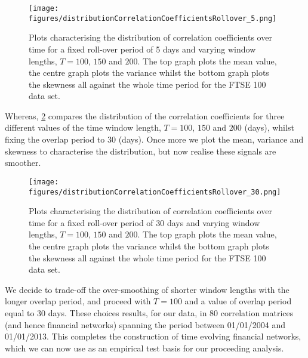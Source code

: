 \begin{figure}
	\centering
	\texttt{[image: figures/distributionCorrelationCoefficientsRollover\_5.png]}
	\caption[Plots characterising the distribution of correlation coefficients for a fixed roll-over period of 5 days and varying window lengths.]{\label{fig:distributionCorrelationCoefficientsRollover5} Plots characterising the distribution of correlation coefficients over time for a fixed roll-over period of 5 days and varying window lengths, $T=100$, $150$ and $200$. The top graph plots the mean value, the centre graph plots the variance whilst the bottom graph plots the skewness all against the whole time period for the FTSE 100 data set.}
\end{figure}

Whereas, \cref{fig:distributionCorrelationCoefficientsRollover30} compares the distribution of the correlation coefficients for three different values of the time window length, $T=100$, $150$ and $200$ (days), whilst fixing the overlap period to 30 (days).
Once more we plot the mean, variance and skewness to characterise the distribution, but now realise these signals are smoother.

\begin{figure}
	\centering
	\texttt{[image: figures/distributionCorrelationCoefficientsRollover\_30.png]}
	\caption[Plots characterising the distribution of correlation coefficients for a fixed roll-over period of 30 days and varying window lengths.]{\label{fig:distributionCorrelationCoefficientsRollover30} Plots characterising the distribution of correlation coefficients over time for a fixed roll-over period of 30 days and varying window lengths, $T=100$, $150$ and $200$. The top graph plots the mean value, the centre graph plots the variance whilst the bottom graph plots the skewness all against the whole time period for the FTSE 100 data set.}
\end{figure}

We decide to trade-off the over-smoothing of shorter window lengths with the longer overlap period, and proceed with $T=100$ and a value of overlap period equal to 30 days.
These choices results, for our data, in 80 correlation matrices (and hence financial networks) spanning the period between 01/01/2004 and 01/01/2013.
This completes the construction of time evolving financial networks, which we can now use as an empirical test basis for our proceeding analysis.



